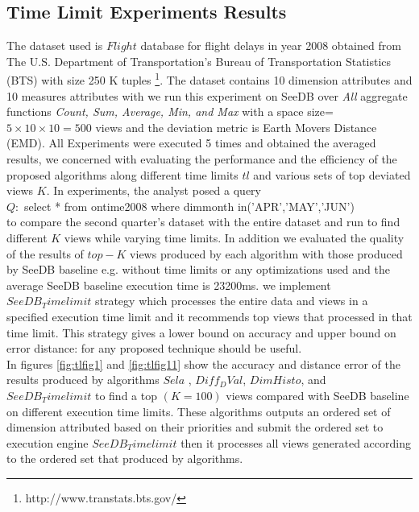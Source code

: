 \subsection{Time Limit Experiments Results}
%
The dataset used is $Flight$ database for flight delays in year 2008 obtained from The U.S. Department of Transportation's Bureau of Transportation Statistics (BTS) with size 250 K tuples \footnote { http://www.transtats.bts.gov/}. The dataset 
contains 10 dimension attributes and 10 measures attributes with 
we run this experiment on SeeDB 
over \emph{All} aggregate functions \emph{Count, Sum, Average, Min, and Max} with 
a space size=$5 \times 10 \times 10=500$ views and 
the deviation metric is Earth Movers Distance (EMD). All Experiments were executed 5 times and obtained the averaged results, we concerned with evaluating the 
performance and the efficiency of the proposed algorithms along different time limits $tl$ and various sets of top deviated views $K$. In experiments, the analyst
posed a query\\
 $Q:$ select * from ontime2008 where dimmonth in('APR','MAY','JUN') \\ to compare the second quarter's dataset with the entire dataset and run to find different $K$ views while varying time limits. In addition we evaluated the quality of the results of $top-K$ views produced by each algorithm with those produced by SeeDB baseline e.g. without time limits or any optimizations used and the average SeeDB baseline execution time is 23200ms. 
we implement $SeeDB_Timelimit$ strategy which processes the entire data and views in a specified execution time limit and it recommends top views that processed in that time limit.
This strategy gives a lower bound on accuracy and upper bound
on error distance: for any proposed technique should be useful. 
\\ In figures \ref{fig:tlfig1} and \ref{fig:tlfig11} show the accuracy and distance error of the results produced by
algorithms $Sela$ , $Diff_DVal$, $DimHisto$, and $SeeDB_Timelimit$ to find a top $(K=100)$ views compared with SeeDB baseline on different execution time limits. These algorithms outputs an ordered set
of dimension attributed based on their priorities and submit the ordered set to execution engine $SeeDB_Timelimit$ then it processes all views generated according to the ordered set that produced by algorithms.
